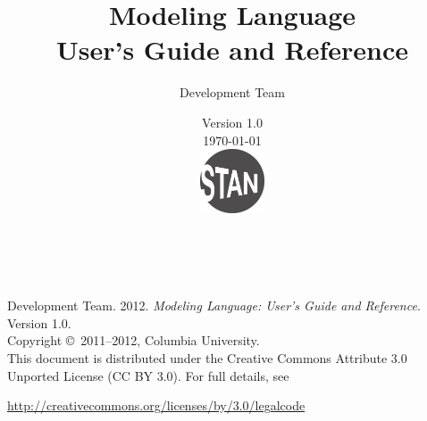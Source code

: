 \title{\Huge\bf \Stan Modeling Language \\[4pt] {\LARGE User's Guide and Reference}}
\author{\Stan Development Team}
\date{\vspace*{36pt} \Stan Version 1.0 \\[4pt] {\small \today}
\\
\vfill
\includegraphics[width=0.75in]{../../../logos/stanlogo-main.pdf}}

\maketitle

\newpage
\thispagestyle{empty}
\mbox{ }
\vfill
\begin{center}
\begin{minipage}[t]{0.75\textwidth}
\small
\Stan Development Team. 2012.  
{\it \Stan Modeling Language: User's Guide and Reference}. Version
1.0.  
\vspace*{20pt}
\mbox{ }
\\
Copyright \copyright \ 2011--2012, Columbia University.
\vspace*{28pt}
\mbox{} \\
This document is distributed under the Creative Commons Attribute 3.0
Unported License (CC BY 3.0).  For full details, see
\begin{center}
\url{http://creativecommons.org/licenses/by/3.0/legalcode} 
\end{center}
\end{minipage}
\vspace*{24pt}
\mbox{ }
\end{center}
